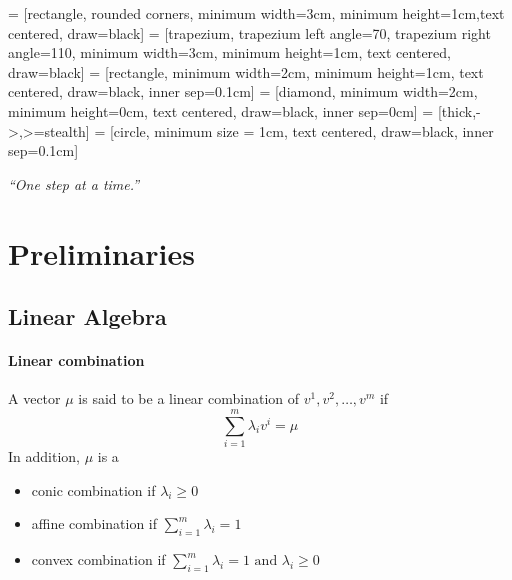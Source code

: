 
\usepackage{makecell}

\usetikzlibrary{shapes.geometric, arrows}
     = [rectangle, rounded corners, minimum width=3cm, minimum height=1cm,text centered, draw=black]
     = [trapezium, trapezium left angle=70, trapezium right angle=110, minimum width=3cm, minimum height=1cm, text centered, draw=black]
     = [rectangle, minimum width=2cm, minimum height=1cm, text centered, draw=black, inner sep=0.1cm]
     = [diamond, minimum width=2cm, minimum height=0cm, text centered, draw=black, inner sep=0cm]
     = [thick,->,>=stealth]
     = [circle, minimum size = 1cm, text centered, draw=black, inner sep=0.1cm]

\renewcommand{\docTitle}{Lecture 1 - Simplex Method}
\renewcommand{\docAuthor}{Lan Peng, Ph.D.}
\renewcommand{\docAffil}{School of Management, Shanghai University, Shanghai, China}

    \titleSecb

    \begin{center}
        \textit{``One step at a time.''}
    \end{center}

    \section{Preliminaries}
        \subsection{Linear Algebra}
            \paragraph{Linear combination}
                A vector $\mu$ is said to be a linear combination of $v^1, v^2, \dots, v^m$ if
                \begin{equation*}
                    \sum_{i=1}^m\lambda_i v^i=\mu
                \end{equation*}
                In addition, $\mu$ is a 
                \begin{itemize}
                    \item conic combination if $\lambda_i \ge 0$
                    \item affine combination if $\sum_{i=1}^m \lambda_i =1$
                    \item convex combination if $\sum_{i=1}^m \lambda_i =1 \text{ and } \lambda_i \ge 0$
                \end{itemize}

